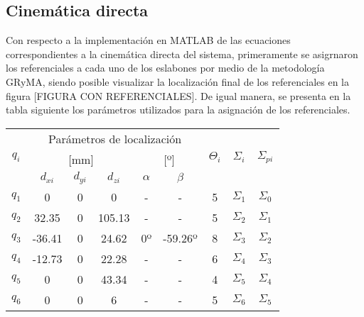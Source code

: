 \subsection{Cinemática directa}
    Con respecto a la implementación en MATLAB de las ecuaciones correspondientes a la 
    cinemática directa del sistema, primeramente se asigrnaron los referenciales 
    a cada uno de los eslabones por medio de la metodología GRyMA, siendo posible 
    visualizar la localización final de los referenciales en la figura [FIGURA 
    CON REFERENCIALES]. De igual manera, se presenta en la tabla siguiente los parámetros 
    utilizados para la asignación de los referenciales.

    \begin{table}[H]
        \centering
        \begin{center}
            \begin{tabular}{c||ccc|cc|c|c|c}
                \multirow{3}{*}{$q_i$} & \multicolumn{5}{c|}{Parámetros de localización}               & \multirow{3}{*}{$\Theta_i$} & \multirow{3}{*}{$\Sigma_i$} & \multirow{3}{*}{$\Sigma_{pi}$} \\
                                       & \multicolumn{3}{c|}{{[}mm{]}}  & \multicolumn{2}{c|}{{[}º{]}} &                             &                             &                                \\
                                       & $d_{xi}$ & $d_{yi}$ & $d_{zi}$ & $\alpha$      & $\beta$      &                             &                             &                                \\ \hline \hline
                $q_1$                  & 0        & 0        & 0        & -             & -            & 5                           & $\Sigma_1$                  & $\Sigma_0$                     \\
                $q_2$                  & 32.35    & 0        & 105.13   & -             & -            & 5                           & $\Sigma_2$                  & $\Sigma_1$                     \\
                $q_3$                  & -36.41   & 0        & 24.62    & 0º            & -59.26º      & 8                           & $\Sigma_3$                  & $\Sigma_2$                     \\
                $q_4$                  & -12.73   & 0        & 22.28    & -             & -            & 6                           & $\Sigma_4$                  & $\Sigma_3$                     \\
                $q_5$                  & 0        & 0        & 43.34    & -             & -            & 4                           & $\Sigma_5$                  & $\Sigma_4$                     \\
                $q_6$                  & 0        & 0        & 6        & -             & -            & 5                           & $\Sigma_6$                  & $\Sigma_5$                    
            \end{tabular}
        \end{center}
    \end{table}

